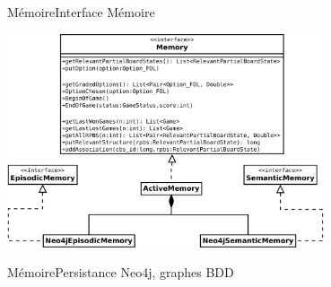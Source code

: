 \begin{frame}{Mémoire}{Interface Mémoire}
\begin{center}
\includegraphics[width=0.7\textwidth]{img/implementation_memory/interface}
\end{center}
\end{frame}

\begin{frame}{Mémoire}{Persistance}
Neo4j, graphes BDD
\end{frame}